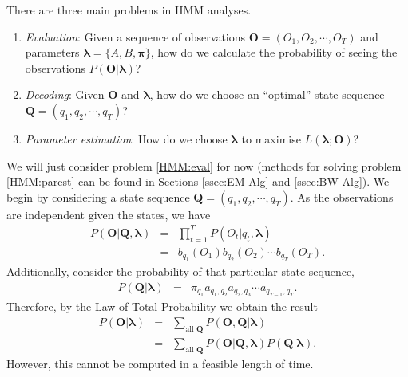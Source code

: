 \documentclass[12pt]{article}
\begin{document}
There are three main problems in HMM analyses.
\begin{enumerate}
\item \emph{Evaluation}: Given a sequence of observations $\bm{O}=(O_1,O_2,\cdots,O_T)$ and parameters $\bm{\lambda}=\{A,B,\bm{\pi}\}$, how do we calculate the probability of seeing the observations $P(\bm{O}|\bm{\lambda})$? \label{HMM:eval}
\item \emph{Decoding}: Given $\bm{O}$ and $\bm{\lambda}$, how do we choose an ``optimal'' state sequence $\bm{Q}=(q_1,q_2,\cdots,q_T)$? \label{HMM:dec}
\item \emph{Parameter estimation}: How do we choose $\bm{\lambda}$ to maximise $L(\bm{\lambda};\bm{O})$? \label{HMM:parest}
  
\end{enumerate}

We will just consider problem \ref{HMM:eval} for now (methods for solving problem \ref{HMM:parest} can be found in Sections \ref{ssec:EM-Alg} and \ref{ssec:BW-Alg}). We begin by considering a state sequence $\bm{Q}=(q_1,q_2,\cdots,q_T)$. As the observations are independent given the states, we have
\begin{eqnarray*}
  P(\bm{O}|\bm{Q},\bm{\lambda})&=&\prod_{t=1}^TP(O_t|q_t,\bm{\lambda})\\
  &=&b_{q_1}(O_1)b_{q_2}(O_2)\cdots b_{q_T}(O_T).
\end{eqnarray*}
Additionally, consider the probability of that particular state sequence,
\begin{eqnarray*}
  P(\bm{Q}|\bm{\lambda})&=&\pi_{q_1}a_{q_1,q_2}a_{q_2,q_3}\cdots a_{q_{T-1},q_T}.
\end{eqnarray*}
Therefore, by the Law of Total Probability we obtain the result
\begin{eqnarray*}
  P(\bm{O}|\bm{\lambda})&=&\sum_{\text{all }\bm{Q}}P(\bm{O},\bm{Q}|\bm{\lambda})\\
  &=&\sum_{\text{all }\bm{Q}}P(\bm{O}|\bm{Q},\bm{\lambda})P(\bm{Q}|\bm{\lambda}).
\end{eqnarray*}
However, this cannot be computed in a feasible length of time.
\end{document}
